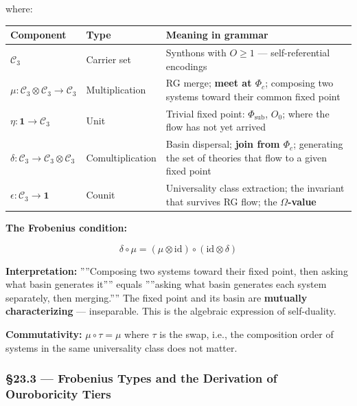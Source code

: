 \documentclass[12pt,a4paper]{article}
\newcommand{\pilcrow}{\S}
\begin{document}
where:

\begin{table}[htbp]
\centering
\small
{}
\begin{tabularx}{\textwidth}{>{\centering\arraybackslash}X >{\centering\arraybackslash}X >{\centering\arraybackslash}X}
\toprule
\rowcolor{gray!25}\textbf{Component} & \textbf{Type} & \textbf{Meaning in grammar} \\
\midrule
\rowcolors{1}{white}{gray!10}
$\mathcal{C}_3$ & Carrier set & Synthons with $O \geq 1$ --- self-referential encodings \\
$\mu : \mathcal{C}_3 \otimes \mathcal{C}_3 \to \mathcal{C}_3$ & Multiplication & RG merge; \textbf{meet at $\Phi_c$}; composing two systems toward their common fixed point \\
$\eta : \mathbf{1} \to \mathcal{C}_3$ & Unit & Trivial fixed point: $\Phi_\text{sub}$, $O_0$; where the flow has not yet arrived \\
$\delta : \mathcal{C}_3 \to \mathcal{C}_3 \otimes \mathcal{C}_3$ & Comultiplication & Basin dispersal; \textbf{join from $\Phi_c$}; generating the set of theories that flow to a given fixed point \\
$\epsilon : \mathcal{C}_3 \to \mathbf{1}$ & Counit & Universality class extraction; the invariant that survives RG flow; the \textbf{$\Omega$-value} \\
\bottomrule
\end{tabularx}
\end{table}

\textbf{The Frobenius condition:}

\[\delta \circ \mu = (\mu \otimes \text{id}) \circ (\text{id} \otimes \delta)\]

\textbf{Interpretation:} ''''Composing two systems toward their fixed point, then asking what basin generates it'''' equals ''''asking what basin generates each system separately, then merging.'''' The fixed point and its basin are \textbf{mutually characterizing} --- inseparable. This is the algebraic expression of self-duality.

\textbf{Commutativity:} $\mu \circ \tau = \mu$ where $\tau$ is the swap, i.e., the composition order of systems in the same universality class does not matter.

\subsubsection{\pilcrow{}23.3 --- Frobenius Types and the Derivation of Ouroboricity Tiers}
\end{document}
